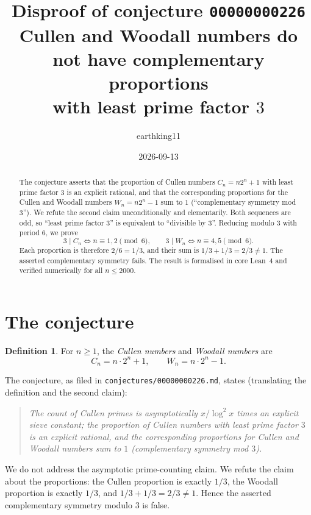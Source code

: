 \documentclass[11pt]{article}
\title{Disproof of conjecture \texttt{00000000226}\\
\large Cullen and Woodall numbers do not have complementary proportions\\
with least prime factor \(3\)}
\author{earthking11}
\date{2026-09-13}
\theoremstyle{definition}
\newtheorem{definition}[theorem]{Definition}
\newcommand{\Cul}{C}
\newcommand{\Woo}{W}
\begin{document}
\maketitle

\begin{abstract}
The conjecture asserts that the proportion of Cullen numbers \(C_n=n2^n+1\)
with least prime factor \(3\) is an explicit rational, and that the
corresponding proportions for the Cullen and Woodall numbers
\(\Woo_n=n2^n-1\) sum to \(1\) (``complementary symmetry mod \(3\)'').
We refute the second claim unconditionally and elementarily. Both sequences
are odd, so ``least prime factor \(3\)'' is equivalent to ``divisible by
\(3\)''. Reducing modulo \(3\) with period \(6\), we prove
\[
3\mid C_n \iff n\equiv 1,2 \pmod 6,
\qquad
3\mid \Woo_n \iff n\equiv 4,5 \pmod 6 .
\]
Each proportion is therefore \(2/6=1/3\), and their sum is
\(1/3+1/3=2/3\neq 1\). The asserted complementary symmetry fails. The result
is formalised in core Lean~4 and verified numerically for all \(n\le 2000\).
\end{abstract}

\section{The conjecture}

\begin{definition}
For \(n\ge 1\), the \emph{Cullen numbers} and \emph{Woodall numbers} are
\[
\Cul_n = n\cdot 2^n + 1,
\qquad
\Woo_n = n\cdot 2^n - 1 .
\]
\end{definition}

The conjecture, as filed in \texttt{conjectures/00000000226.md}, states
(translating the definition and the second claim):

\begin{quote}
\itshape
The count of Cullen primes is asymptotically \(x/\log^2 x\) times an explicit
sieve constant; the proportion of Cullen numbers with least prime factor \(3\)
is an explicit rational, and the corresponding proportions for Cullen and
Woodall numbers sum to \(1\) (complementary symmetry mod \(3\)).
\end{quote}

We do not address the asymptotic prime-counting claim. We refute the claim
about the proportions: the Cullen proportion is exactly \(1/3\), the Woodall
proportion is exactly \(1/3\), and \(1/3+1/3=2/3\neq 1\). Hence the asserted
complementary symmetry modulo \(3\) is false.
\end{document}
